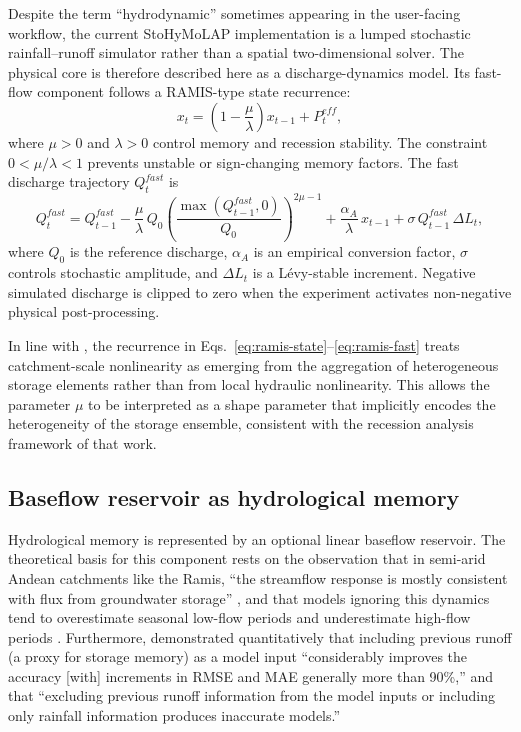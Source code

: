 \documentclass[a4paper,fleqn]{cas-sc}
\begin{document}
Despite the term ``hydrodynamic'' sometimes appearing in the
user-facing workflow, the current StoHyMoLAP implementation is a lumped
stochastic rainfall--runoff simulator rather than a spatial
two-dimensional solver. The physical core is therefore described here
as a discharge-dynamics model. Its fast-flow component follows a
RAMIS-type state recurrence:
\begin{equation}
x_t = \left(1 - \frac{\mu}{\lambda}\right)x_{t-1} + P^{eff}_t,
\label{eq:ramis-state}
\end{equation}
where $\mu>0$ and $\lambda>0$ control memory and recession stability.
The constraint $0<\mu/\lambda<1$ prevents unstable or sign-changing
memory factors. The fast discharge trajectory $Q^{fast}_t$ is
\begin{equation}
Q^{fast}_t = Q^{fast}_{t-1}
  - \frac{\mu}{\lambda}\,Q_0
    \left(\frac{\max(Q^{fast}_{t-1},0)}{Q_0}\right)^{2\mu-1}
  + \frac{\alpha_A}{\lambda}\,x_{t-1}
  + \sigma\,Q^{fast}_{t-1}\,\Delta L_t,
\label{eq:ramis-fast}
\end{equation}
where $Q_0$ is the reference discharge, $\alpha_A$ is an empirical
conversion factor, $\sigma$ controls stochastic amplitude, and
$\Delta L_t$ is a L\'{e}vy-stable increment.
Negative simulated discharge is clipped to zero when the experiment
activates non-negative physical post-processing.

In line with \citet{harman2009}, the recurrence in Eqs.\
\ref{eq:ramis-state}--\ref{eq:ramis-fast} treats catchment-scale
nonlinearity as emerging from the aggregation of heterogeneous
storage elements rather than from local hydraulic nonlinearity. This
allows the parameter $\mu$ to be interpreted as a shape parameter
that implicitly encodes the heterogeneity of the storage ensemble,
consistent with the recession analysis framework of that work.

\subsection{Baseflow reservoir as hydrological memory}
\label{subsec:baseflow}

Hydrological memory is represented by an optional linear baseflow
reservoir. The theoretical basis for this component rests on the
observation that in semi-arid Andean catchments like the Ramis,
``the streamflow response is mostly consistent with flux from
groundwater storage'' \citep{nauditt2017}, and that models ignoring
this dynamics tend to overestimate seasonal low-flow periods and
underestimate high-flow periods \citep{nauditt2017}. Furthermore,
\citet{adnan2021comparison} demonstrated quantitatively that
including previous runoff (a proxy for storage memory) as a model
input ``considerably improves the accuracy [with] increments in RMSE
and MAE generally more than 90\%,'' and that ``excluding previous
runoff information from the model inputs or including only rainfall
information produces inaccurate models.''
\end{document}
